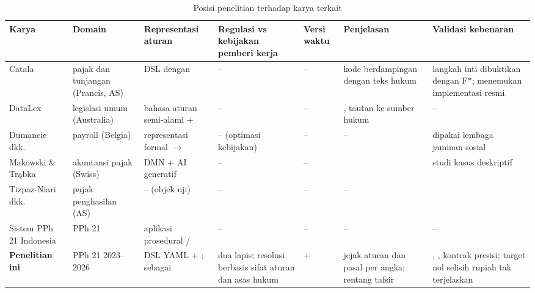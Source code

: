 \begin{table}[t]
\centering
\caption{Posisi penelitian terhadap karya terkait}
\label{tab:posisi}
\footnotesize
\begin{tabularx}{\textwidth}{@{}P{2.6cm} P{2.0cm} L L P{1.9cm} L L@{}}
\toprule
\textbf{Karya} & \textbf{Domain} & \textbf{Representasi aturan} & \textbf{Regulasi vs kebijakan pemberi kerja} & \textbf{Versi waktu} & \textbf{Penjelasan} & \textbf{Validasi kebenaran} \\
\midrule
Catala~\cite{merigoux2021catala,huttner2022catala} & pajak dan tunjangan (Prancis, AS) & DSL dengan  & -- & -- & kode berdampingan dengan teks hukum & langkah inti  dibuktikan dengan F*; menemukan  implementasi resmi \\
DataLex~\cite{mowbray2023scaling,mowbray2023xai} & legislasi umum (Australia) & bahasa aturan semi-alami +  & -- & -- & , tautan ke sumber hukum & -- \\
Dumancic dkk.~\cite{dumancic2021payroll} & payroll (Belgia) & representasi formal $\rightarrow$  & -- (optimasi kebijakan) & -- & -- & dipakai lembaga jaminan sosial \\
Makowski \& Tr\k{a}bka~\cite{makowski2025dmn} & akuntansi pajak (Swiss) & DMN + AI generatif & -- & -- &  & studi kasus deskriptif \\
Tizpaz-Niari dkk.~\cite{tizpaz2023metamorphic} & pajak penghasilan (AS) & -- (objek uji) & -- & -- & -- &  \\
Sistem PPh 21 Indonesia~\cite{ramadhani2021grossup,yulistyawati2022payroll,kusuma2026pph21} & PPh 21 & aplikasi prosedural /  & -- & -- & -- & -- \\
\midrule
\textbf{Penelitian ini} & PPh 21 2023--2026 & DSL YAML + ;  sebagai  & dua lapis; resolusi berbasis sifat aturan dan asas hukum &  +  & jejak aturan dan pasal per angka; rentang tafsir & , , kontrak presisi; target nol selisih rupiah tak terjelaskan \\
\bottomrule
\end{tabularx}
\end{table}
